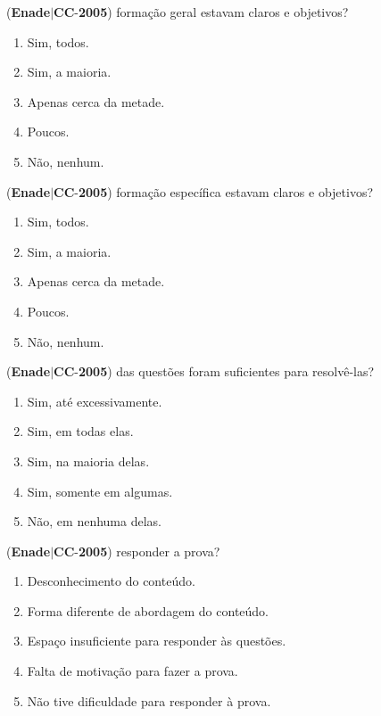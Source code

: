 \documentclass{exam}
\begin{document}
\begin{questions}
\begin{enumerate}[label=\alph*)]
	\end{enumerate}

\question (\textbf{Enade}$|$\textbf{CC}-\textbf{2005}) formação geral estavam claros e objetivos?
	\begin{enumerate}[label=\alph*)]
		\item  Sim, todos.
		\item  Sim, a maioria.
		\item  Apenas cerca da metade.
		\item  Poucos.
		\item  Não, nenhum.

	\end{enumerate}

\question (\textbf{Enade}$|$\textbf{CC}-\textbf{2005}) formação específica estavam claros e objetivos?
	\begin{enumerate}[label=\alph*)]
		\item  Sim, todos.
		\item  Sim, a maioria.
		\item  Apenas cerca da metade.
		\item  Poucos.
		\item  Não, nenhum.

	\end{enumerate}

\question (\textbf{Enade}$|$\textbf{CC}-\textbf{2005}) das questões foram suficientes para resolvê-las?
	\begin{enumerate}[label=\alph*)]
		\item  Sim, até excessivamente.
		\item  Sim, em todas elas.
		\item  Sim, na maioria delas.
		\item  Sim, somente em algumas.
		\item  Não, em nenhuma delas.

	\end{enumerate}

\question (\textbf{Enade}$|$\textbf{CC}-\textbf{2005}) responder a prova?
	\begin{enumerate}[label=\alph*)]
		\item  Desconhecimento do conteúdo.
		\item  Forma diferente de abordagem do conteúdo.
		\item  Espaço insuficiente para responder às questões.
		\item  Falta de motivação para fazer a prova.
		\item  Não tive dificuldade para responder à prova.


\end{enumerate}
\end{questions}
\end{document}

